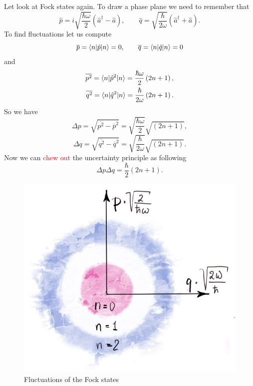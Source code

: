 Let look at Fock states again. To draw a phase plane we need to remember that
\begin{equation}
	\hat{p} = i \sqrt{\frac{\hbar \omega}{2}} \left( \hat{a}^{\dagger} - \hat{a} \right), \qquad \hat{q} = \sqrt{\frac{\hbar}{2 \omega}}\left( \hat{a}^{\dagger} + \hat{a} \right).
\end{equation}
To find fluctuations let us compute
\begin{equation}
	\overline{p} = \langle n\rvert \hat{p} \lvert n\rangle = 0, \qquad \overline{q} = \langle n\rvert \hat{q} \lvert n\rangle = 0
\end{equation}
and
\begin{eqnarray}
	\overline{p^2} = \langle n\rvert \hat{p}^2 \lvert n\rangle = \frac{\hbar \omega}{2} \left( 2n+1 \right), \\
	\overline{q^2} = \langle n\rvert \hat{q}^2 \lvert n\rangle = \frac{\hbar}{2 \omega} \left( 2n+1 \right).
\end{eqnarray}
So we have
\begin{equation}
	\Delta p = \sqrt{\overline{p^2} - \overline{p}^2} = \sqrt{\frac{\hbar \omega}{2}} \sqrt{\left( 2n+1 \right)},
\end{equation}
\begin{equation}
	\Delta q = \sqrt{\overline{q^2} - \overline{q}^2} = \sqrt{\frac{\hbar }{2\omega}} \sqrt{\left( 2n+1 \right)}.
\end{equation}
Now we can {\textcolor{red}{chew out}} the uncertainty principle as following
\begin{equation}
	\Delta p \Delta q = \frac{\hbar}{2} \left(2n+1\right).
\end{equation}

\begin{figure}
	\centering
	\includegraphics[width=0.4\linewidth]{fig/L2/fluc2}
	\caption{Fluctuations of the Fock states}
	\label{fig:fluc}
\end{figure}

